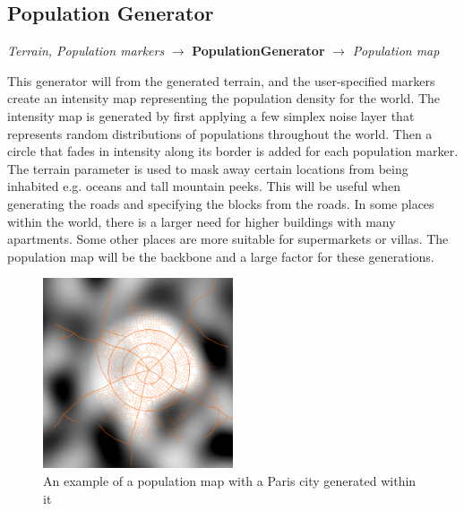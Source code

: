 \subsection{Population Generator}
\begin{center}
    \textit{Terrain, Population markers} $\rightarrow$ \textbf{PopulationGenerator} $\rightarrow$ \textit{Population map} 
\end{center}
This generator will from the generated terrain, and the user-specified markers create an intensity map representing the population density for the world.
The intensity map is generated by first applying a few simplex noise layer that represents random distributions of populations throughout the world. 
Then a circle that fades in intensity along its border is added for each population marker. 
The terrain parameter is used to mask away certain locations from being inhabited e.g. oceans and tall mountain peeks.
This will be useful when generating the roads and specifying the blocks from the roads. 
In some places within the world, there is a larger need for higher buildings with many apartments. 
Some other places are more suitable for supermarkets or villas. 
The population map will be the backbone and a large factor for these generations. 

\begin{figure}[h]
  \centering
  \includegraphics[width=0.5\textwidth]{figure/gen_population_map.png}
  \caption{An example of a population map with a Paris city generated within it}
  \label{fig:gen_population_map_example}
\end{figure}
